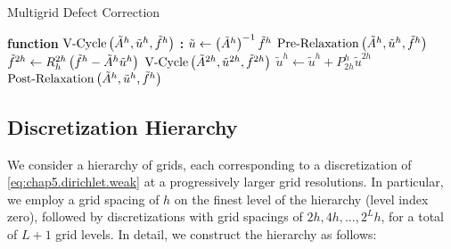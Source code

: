 \begin{algorithm}[htbp]
\caption{Multigrid Defect Correction}
\label{alg:chap5.multigrid}
\begin{algorithmic}[1]
\STATE \textbf{function} $\operatorname{V-Cycle} \left( \tilde{A}^h, \tilde{u}^h, \tilde{f}^h \right)$ \textbf{:}
    \STATE $\tilde{u} \leftarrow \left( \tilde{A}^h \right)^{-1} \tilde{f}^h$
    \RETURN
\ENDIF
\STATE $\operatorname{Pre-Relaxation} \left( \tilde{A}^h, \tilde{u}^h, \tilde{f}^h \right)$
\STATE $\tilde{f}^{2h} \leftarrow R_h^{2h} \left( \tilde{f}^h - \tilde{A}^h \tilde{u}^h \right)$ 
\STATE $\operatorname{V-Cycle} \left( \tilde{A}^{2h}, \tilde{u}^{2h}, \tilde{f}^{2h} \right)$
\STATE $\tilde{u}^h \leftarrow \tilde{u}^h + P_{2h}^h \tilde{u}^{2h}$ 
\STATE $\operatorname{Post-Relaxation} \left( \tilde{A}^h, \tilde{u}^h, \tilde{f}^h \right)$
\RETURN
\end{algorithmic}
\end{algorithm}

\subsection{Discretization Hierarchy}

We consider a hierarchy of grids, each corresponding to a discretization of \eqref{eq:chap5.dirichlet.weak} at a progressively larger grid resolutions. In particular, we employ a grid spacing of $h$ on the finest level of the hierarchy (level index zero), followed by discretizations with grid spacings of $2h, 4h, \dotsc, 2^Lh$, for a total of $L+1$ grid levels. In detail, we construct the hierarchy as follows:

